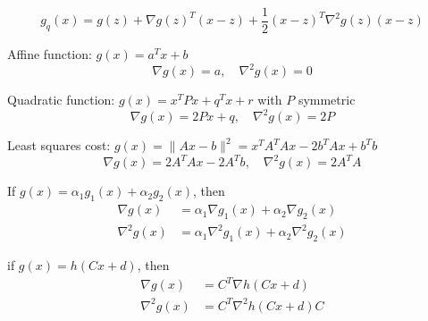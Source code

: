 \begin{definition}
    \begin{equation} g_{{q}}(x)=g(z)+\nabla g(z)^{T}(x-z)+\frac{1}{2}(x-z)^{T} \nabla^{2} g(z)(x-z) \end{equation}
\end{definition}

\begin{example}
    Affine function: $ g(x)=a^{T} x+b $
\begin{equation}
\nabla g(x)=a, \quad \nabla^{2} g(x)=0
\end{equation}

Quadratic function: $ g(x)=x^{T} P x+q^{T} x+r $ with $ P $ symmetric
\begin{equation}
\nabla g(x)=2 P x+q, \quad \nabla^{2} g(x)=2 P
\end{equation}

Least squares cost: $ g(x)=\|A x-b\|^{2}=x^{T} A^{T} A x-2 b^{T} A x+b^{T} b $
\begin{equation}
\nabla g(x)=2 A^{T} A x-2 A^{T} b, \quad \nabla^{2} g(x)=2 A^{T} A
\end{equation}
\end{example}

\begin{theorem}
    If $ g(x)=\alpha_{1} g_{1}(x)+\alpha_{2} g_{2}(x) $, then
\begin{equation}
\begin{aligned}
\nabla g(x) &=\alpha_{1} \nabla g_{1}(x)+\alpha_{2} \nabla g_{2}(x) \\
\nabla^{2} g(x) &=\alpha_{1} \nabla^{2} g_{1}(x)+\alpha_{2} \nabla^{2} g_{2}(x)
\end{aligned}
\end{equation}
\end{theorem}

\begin{theorem}
    if $ g(x)=h(C x+d) $, then
\begin{equation}
\begin{aligned}
\nabla g(x) &=C^{T} \nabla h(C x+d) \\
\nabla^{2} g(x) &=C^{T} \nabla^{2} h(C x+d) C
\end{aligned}
\end{equation}
\end{theorem}

